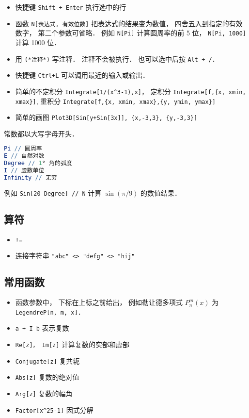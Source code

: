 
\begin{issues}
\issueDraft
\end{issues}


\begin{itemize}
\item 快捷键 \verb|Shift + Enter| 执行选中的行
\item 函数 \verb|N[表达式, 有效位数]| 把表达式的结果变为数值， 四舍五入到指定的有效数字， 第二个参数可省略． 例如 \verb|N[Pi]| 计算圆周率的前 5 位， \verb|N[Pi, 1000]| 计算 1000 位．
\item 用 \verb|(*注释*)| 写注释． 注释不会被执行． 也可以选中后按 \verb|Alt + /|．
\item 快捷键 \verb|Ctrl+L| 可以调用最近的输入或输出．
\item 简单的不定积分 \verb|Integrate[1/(x^3-1),x]|， 定积分 \verb|Integrate[f,{x, xmin, xmax}]|, 重积分 \verb|Integrate[f,{x, xmin, xmax},{y, ymin, ymax}]|
\item 简单的画图 \verb|Plot3D[Sin[y+Sin[3x]], {x,-3,3}, {y,-3,3}]|
\end{itemize}

常数都以大写字母开头．
\begin{lstlisting}[language=Mathematica]
Pi // 圆周率
E // 自然对数
Degree // 1° 角的弧度
I // 虚数单位
Infinity // 无穷
\end{lstlisting}
例如 \verb|Sin[20 Degree] // N| 计算 $\sin(\pi/9)$ 的数值结果．


\subsection{算符}
\begin{itemize}
\item \verb|!=|
\item 连接字符串 \verb|"abc" <> "defg" <> "hij"|
\end{itemize}

\subsection{常用函数}
\begin{itemize}
\item 函数参数中， 下标在上标之前给出， 例如勒让德多项式 $P_n^m(x)$ 为 \verb|LegendreP[n, m, x]|．
\item \verb|a + I b| 表示复数
\item \verb|Re[z]， Im[z]| 计算复数的实部和虚部
\item \verb|Conjugate[z]| 复共轭
\item \verb|Abs[z]| 复数的绝对值
\item \verb|Arg[z]| 复数的幅角
\item \verb|Factor[x^25-1]| 因式分解
\end{itemize}

